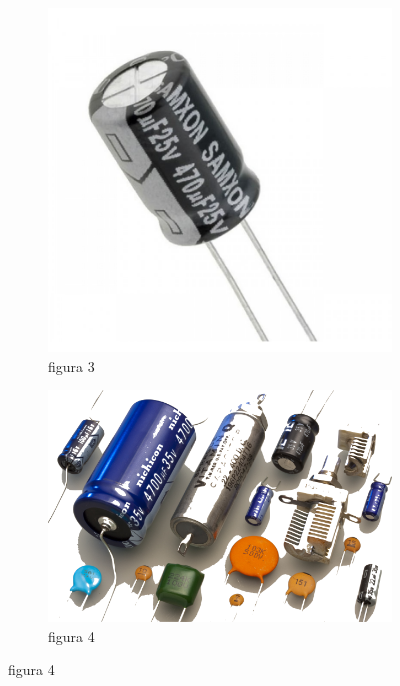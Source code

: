 \documentclass[12pt]{article}
\begin{document}
\begin{figure}[h!]
  \begin{subfigure}[b]{0.25\linewidth}
    \includegraphics[width=\linewidth]{data/condensatore-elettrolitico-valvola.jpg}
    \caption*{figura 3}
  \end{subfigure}
  \begin{subfigure}[b]{0.25\linewidth}
    \includegraphics[width=\linewidth]{data/capacitors-types.png}
    \caption*{figura 4}
  \end{subfigure}
\end{figure}
\end{document}
